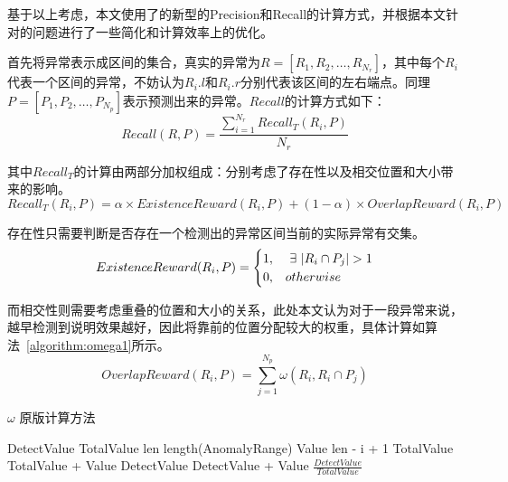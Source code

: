 基于以上考虑，本文使用了\cite{tatbul2018precision}的新型的Precision和Recall的计算方式，并根据本文针对的问题进行了一些简化和计算效率上的优化。

首先将异常表示成区间的集合，真实的异常为$R=[R_1,R_2,\dots,R_{N_r}]$，其中每个$R_i$代表一个区间的异常，不妨认为$R_i.l$和$R_i.r$分别代表该区间的左右端点。同理$P=[P_1,P_2,\dots,P_{N_p}]$表示预测出来的异常。$Recall$的计算方式如下：
\begin{equation*}
  Recall(R,P) = \frac{\sum\limits_{i=1}^{N_r} Recall_T(R_i,P)}{N_r}
\end{equation*}

其中$Recall_T$的计算由两部分加权组成：分别考虑了存在性以及相交位置和大小带来的影响。
\begin{equation*}
  Recall_T(R_i,P) = \alpha \times ExistenceReward(R_i,P) + (1-\alpha) \times OverlapReward (R_i,P)
\end{equation*}

存在性只需要判断是否存在一个检测出的异常区间当前的实际异常有交集。
\begin{equation*}
ExistenceReward(R_i,P) = \begin{cases} 1, & \ \exists \  | R_i \cap P_j|>1 \cr 0, & otherwise \end{cases}
\end{equation*}

而相交性则需要考虑重叠的位置和大小的关系，此处本文认为对于一段异常来说，越早检测到说明效果越好，因此将靠前的位置分配较大的权重，具体计算如算法~\ref{algorithm:omega1}所示。
\begin{equation*}
  OverlapReward(R_i,P) = \sum\limits_{j=1}^{N_p}\omega(R_i,R_i\cap P_j)
\end{equation*}
\begin{algorithm}
  \caption{$\omega$ 原版计算方法\cite{tatbul2018precision}}
  \begin{algorithmic}[1]
      \State DetectValue 
      \State TotalValue 
      \State len \gets length(AnomalyRange)
          \State Value \gets len - i + 1
          \State TotalValue \gets TotalValue + Value
              \State DetectValue \gets DetectValue + Value
          \EndIf
      \EndFor
      \State \Return $\frac{DetectValue}{TotalValue}$
      \EndFunction
  \end{algorithmic}
  \label{algorithm:omega1}
\end{algorithm}

